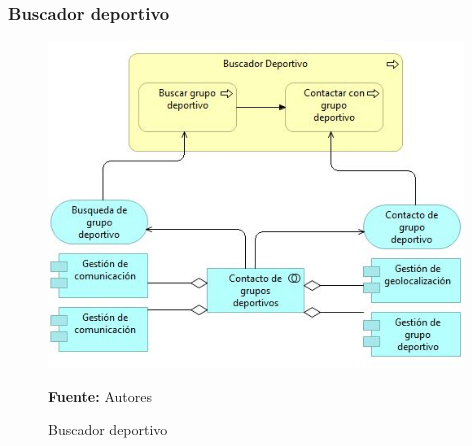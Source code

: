 \clearpage

\subsubsection{Buscador deportivo}

\begin{figure}[!htb]
  \begin{center}
    \includegraphics[width=11cm]{./imagenes/application_usage/buscadordeportivo.png}
    \caption{Buscador deportivo}
    \label{fig:BP_BuscadorDeportivo}
    \textbf{Fuente:}  Autores
  \end{center}
\end{figure}

